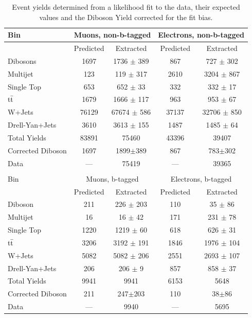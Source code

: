 \begin{table}[tbht!]
\begin{center}
\caption{Event yields determined from a likelihood fit to the data, their expected values and the Diboson Yield corrected for the fit bias.}
 \label{table:FitTotalsAndComparisons}
\vspace{0.5cm}
 \begin{tabular} {l  c  c c c }
   \hline \hline
Bin            &  \multicolumn{2}{c}{Muons, non-b-tagged} & \multicolumn{2}{c}{Electrons, non-b-tagged} \\  
\hline
               & Predicted &   Extracted     &  Predicted &  Extracted \\
\hline
Dibosons       &   1697    &  1736 $\pm$ 389 &    867     &  727 $\pm$ 302 \\
Multijet       &    123    &   119 $\pm$ 317 &   2610     & 3204 $\pm$ 867 \\
Single Top     &    653    &   652 $\pm$ 33  &    332     &  332 $\pm$  17 \\
$\mathrm{t}\bar{\mathrm{t}}$       &   1679    &  1666 $\pm$ 117 &    963     &  953 $\pm$  67 \\
W+Jets         &  76129    & 67674 $\pm$ 586 &  37137     & 32706 $\pm$ 850 \\
Drell-Yan+Jets &   3610    &  3613 $\pm$ 155 &   1487     &  1485 $\pm$ 64 \\
Total Yields   &  83891    &  75460          &  43396     &  39407 \\ 
\hline 
Corrected Diboson & 1697   &   1899$\pm$389  &    867     &   783$\pm$302  \\
\hline 
Data           &    ---    &  75419          &    ---     &  39365 \\ 
\hline
\\
\hline
\hline
Bin            &  \multicolumn{2}{c}{Muons, b-tagged} & \multicolumn{2}{c}{Electrons, b-tagged} \\  
\hline
               & Predicted &   Extracted     &  Predicted &  Extracted \\
\hline
Diboson        &    211    &   226 $\pm$ 203 &    110     &   35 $\pm$ 86 \\
Multijet       &     16    &    16 $\pm$ 42  &    171     &  231 $\pm$ 78 \\
Single Top     &   1220    &  1219 $\pm$ 60  &    618     &  626 $\pm$ 31 \\
$\mathrm{t}\bar{\mathrm{t}}$       &   3206    &  3192 $\pm$ 191 &   1846     & 1976 $\pm$ 104 \\
W+Jets         &   5082    &  5082 $\pm$ 206 &   2551     & 2693 $\pm$ 107 \\
Drell-Yan+Jets &    206    &   206 $\pm$ 9   &    857     &   858 $\pm$ 37 \\
Total Yields   &    9941   &  9941          &    6153     &  5648 \\ 
\hline 
Corrected Diboson &    211 &    247$\pm$203  &    110     &    38$\pm$86  \\
\hline 
Data           &    ---    &  9940          &    ---      &  5695 \\ 
\hline \hline
\end{tabular}
\end{center}
\end{table}


